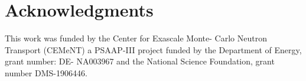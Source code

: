 \documentclass{anstrans}
\begin{document}



\section{Acknowledgments}
This work was funded by the Center for Exascale Monte-
Carlo Neutron Transport (CEMeNT) a PSAAP-III project
funded by the Department of Energy, grant number: DE-
NA003967 and the National Science Foundation, grant number DMS-1906446.




\end{document}
